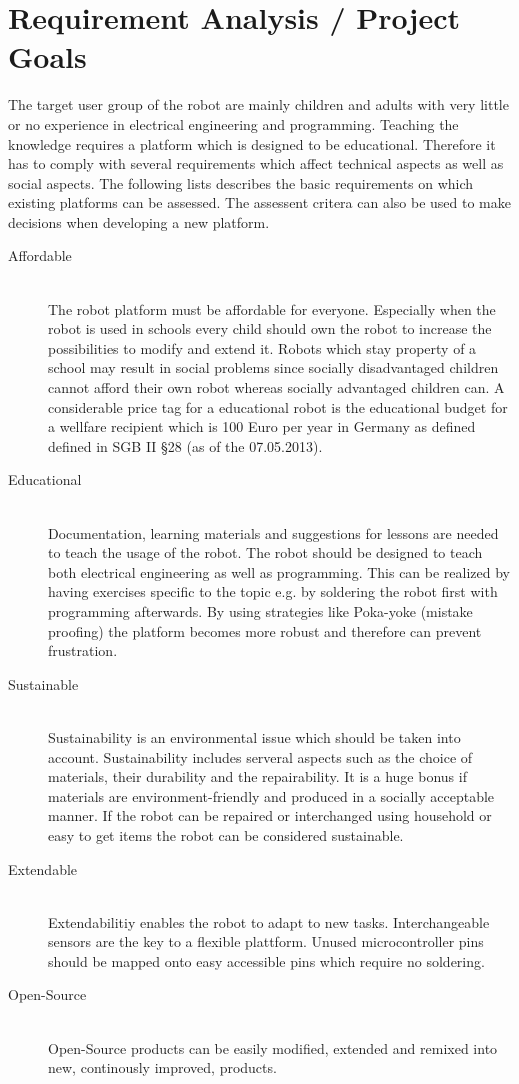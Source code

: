 \documentclass[twocolumn]{article}
\begin{document}
\section{Requirement Analysis / Project Goals}
The target user group of the robot are mainly children and adults with very little or no experience in electrical engineering and programming. Teaching the knowledge requires a platform which is designed to be educational. Therefore it has to comply with several requirements which affect technical aspects as well as social aspects.
The following lists describes the basic requirements on which existing platforms can be assessed. The assessent critera can also be used to make decisions when developing a new platform.
\begin{description}
\item[Affordable] \hfill \\ The robot platform must be affordable for everyone. Especially when the robot is used in schools every child should own the robot to increase the possibilities to modify and extend it. Robots which stay property of a school may result in social problems since socially disadvantaged children cannot afford their own robot whereas socially advantaged children can. A considerable price tag for a educational robot is the educational budget for a wellfare recipient which is 100 Euro per year in Germany as defined defined in SGB II §28 (as of the 07.05.2013).
\item[Educational] \hfill \\ Documentation, learning materials and suggestions for lessons are needed to teach the usage of the robot. The robot should be designed to teach both electrical engineering as well as programming. This can be realized by having exercises specific to the topic e.g. by soldering the robot first with programming afterwards. By using strategies like Poka-yoke (mistake proofing) the platform becomes more robust and therefore can prevent frustration.
\item[Sustainable] \hfill \\ Sustainability is an environmental issue which should be taken into account. Sustainability includes serveral aspects such as the choice of materials, their durability and the repairability. It is a huge bonus if materials are environment-friendly and produced in a socially acceptable manner. If the robot can be repaired or interchanged using household or easy to get items the robot can be considered sustainable. 
\item[Extendable] \hfill \\ Extendabilitiy enables the robot to adapt to new tasks. Interchangeable sensors are the key to a flexible plattform. Unused microcontroller pins should be mapped onto easy accessible pins which require no soldering.
\item[Open-Source] \hfill \\ Open-Source products can be easily modified, extended and remixed into new, continously improved, products.  
\end{description}
\end{document}
